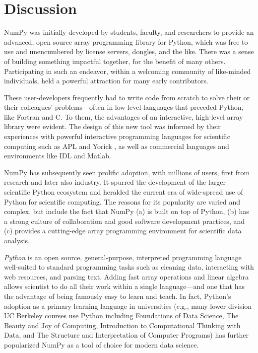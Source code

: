 \section*{Discussion}

NumPy was initially developed by students, faculty, and researchers to
provide an advanced, open source array programming library for Python,
which was free to use and unencumbered by license servers, dongles, and the like.
There was a sense of building something
impactful together, for the benefit of many others.  Participating in
such an endeavor, within a welcoming community of like-minded
individuals, held a powerful attraction for many early contributors.

These user-developers frequently had to write code from scratch to solve
their or their colleagues' problems---often in low-level languages
that preceded Python, like Fortran \cite{dongarra2008netlib} and C.
To them, the advantages of an interactive, high-level array library
were evident. The design of this new tool was informed by their
experiences with powerful interactive programming languages for
scientific computing such as APL \cite{iverson1962programming} and
Yorick \cite{munro1995using}, as well as commercial languages and
environments like IDL and Matlab.

NumPy has subsequently seen prolific adoption, with millions of users,
first from research and later also industry.
It spurred the development of the larger scientific Python ecosystem and
heralded the current era of wide-spread use of Python for scientific computing.
The reasons for its popularity are varied and complex, but include the fact that
NumPy (a) is built on top of Python,
(b) has a strong culture of collaboration and good software development practices, and
(c) provides a cutting-edge array programming environment for scientific data analysis.

\emph{Python} is an open source, general-purpose, interpreted programming language
well-suited to standard programming tasks such as cleaning data,
interacting with web resources, and parsing text.
Adding fast array operations and linear algebra allows scientist to do all
their work within a single language---and one that has the advantage of
being famously easy to learn and teach.
In fact, Python's adoption as a primary learning language in universities
(e.g., many lower division UC Berkeley courses use Python including
Foundations of Data Science,
The Beauty and Joy of Computing,
Introduction to Computational Thinking with Data,
and The Structure and Interpretation of Computer Programs) has
further popularized NumPy as a tool of choice for modern data science.

